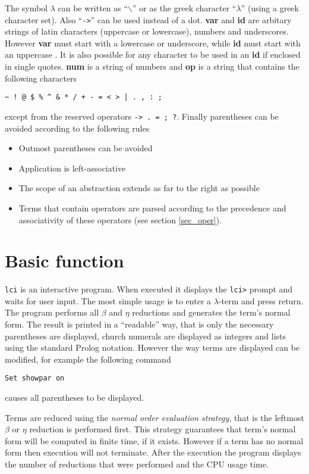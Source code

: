 \documentclass[a4paper,11pt]{article}
\newcommand{\la}{$\lambda$}
\newcommand{\lci}{\texttt{lci}}
\newcommand{\qm}[1]{``#1''}
\begin{document}
The symbol \la{} can be written as \qm{$\backslash$} or as the greek character
\qm{$\lambda$} (using a greek character set). Also ``\verb+->+'' can be used instead
of a dot. \textbf{var} and \textbf{id} are arbitary strings of latin characters
(uppercase or lowercase), numbers and underscores. However \textbf{var} must start
with a lowercase or underscore, while \textbf{id} must start with an
uppercase . It is also possible for any character to be used in an \textbf{id}
if enclosed in single quotes. \textbf{num} is a string of numbers and \textbf{op}
is a string that contains the following characters
\begin{center}
\verb?~ ! @ $ % ^ & * / + - = < > | . , : ; ?
\end{center}
except from the reserved operators \verb+-> . = ; ?+. Finally parentheses can
be avoided according to the following rules
\begin{itemize}
	\item Outmost parentheses can be avoided
	\item Application is left-associative
	\item The scope of an abstraction extends as far to the right as possible
	\item Terms that contain operators are parsed according to the precedence and
	associativity of these operators (see section \ref{sec_oper}).
\end{itemize}

\section{Basic function}
\lci{} is an interactive program. When executed it displays the \verb+lci>+ prompt
and waits for user input. The most simple usage is to enter a \la-term and
press return. The program performs all $\beta$ and $\eta$ reductions and generates
the term's normal form. The result is printed in a \qm{readable} way, that is
only the necessary parentheses are displayed, church numerals are displayed as
integers and lists using the standard Prolog notation. However the way terms
are displayed can be modified, for example the following command
\begin{center}
	\verb+Set showpar on+
\end{center}
causes all parentheses to be displayed.

Terms are reduced using the \emph{normal order evaluation strategy}, that is
the leftmost $\beta$ or $\eta$ reduction is performed first. This strategy
guarantees that term's normal form will be computed in finite time, if it
exists. However if a term has no normal form then execution will not terminate.
After the execution the program displays the number of reductions that were
performed and the CPU usage time.
\end{document}
